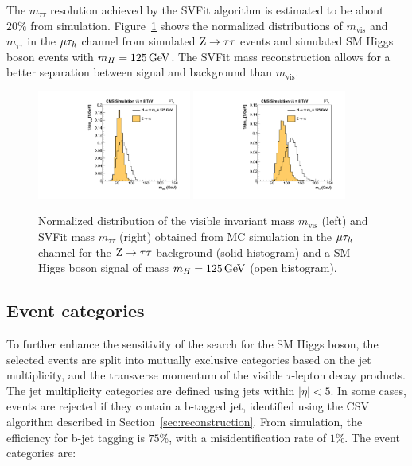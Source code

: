 \documentclass[11pt,twoside,a4paper,cmspaper,final,collab]{cms-tdr}
\begin{document}
The $m_{\tau\tau}$  resolution achieved by the SVFit algorithm is estimated to be about
$20\%$ from simulation.
Figure~\ref{fig:htt_svfitperf} shows the normalized distributions of $m_\text{vis}$ and $m_{\tau\tau}$ in the ${\mu}\tau_h$ channel
from simulated  $\mathrm{Z} \to \tau \tau$ events and simulated SM Higgs boson events with $m_H=125\,\text{Ge\hspace{-.08em}V}$.
The SVFit mass reconstruction allows for a better separation between signal and background than $m_\text{vis}$.

\begin{figure}[htbp]
\begin{center}
\includegraphics[width=0.45\textwidth]{figures/htt/svFitPerformance_forColin_visMass.pdf}
\includegraphics[width=0.45\textwidth]{figures/htt/svFitPerformance_forColin_svFitMass.pdf} \\
\end{center}
\caption{Normalized distribution of the visible invariant mass $m_\text{vis}$ (left) and SVFit mass $m_{\tau\tau}$ (right) obtained from MC simulation in the
${\mu}\tau_h$ channel for the $\mathrm{Z}\to \tau \tau$ background (solid histogram) and a SM Higgs boson signal of mass  $m_H=125\,\text{Ge\hspace{-.08em}V}$ (open histogram).}
\label{fig:htt_svfitperf}
\end{figure}


\subsection{Event categories}

To further enhance the sensitivity of the search for the SM Higgs boson, the selected events are split into mutually exclusive categories based on the
jet multiplicity, and the transverse momentum of the visible $\tau$-lepton decay products.
The jet multiplicity categories are defined using jets within $|\eta|<5$.
In some cases, events are rejected if they contain a b-tagged jet, identified using the CSV algorithm described in Section~\ref{sec:reconstruction}.
From simulation, the efficiency for  b-jet tagging is $75$\%, with a misidentification rate of $1$\%. The event categories are:
\end{document}
